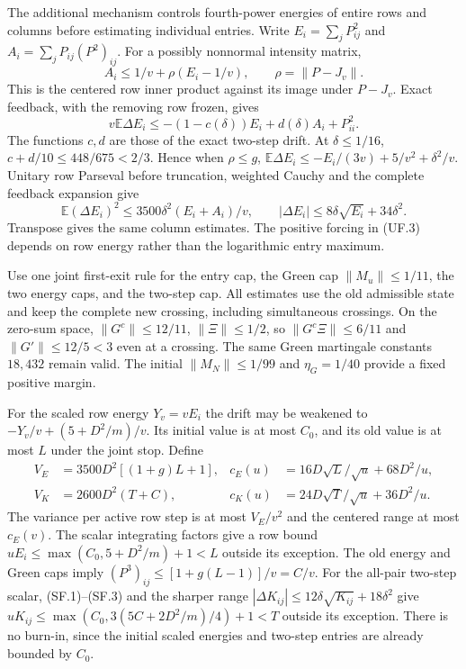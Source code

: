 The additional mechanism controls fourth-power energies of entire rows
and columns before estimating individual entries. Write
$E_i=\sum_jP_{ij}^2$ and $A_i=\sum_jP_{ij}(P^2)_{ij}$. For a possibly
nonnormal intensity matrix,
\[
 A_i\le1/v+\rho(E_i-1/v),\qquad \rho=\|P-J_v\|.           \tag{UF.3}
\]
This is the centered row inner product against its image under $P-J_v$.
Exact feedback, with the removing row frozen, gives
\[
 v\mathbb E\Delta E_i\le-(1-c(\delta))E_i+d(\delta)A_i+P_{ii}^2.
                                                                  \tag{UF.4}
\]
The functions $c,d$ are those of the exact two-step drift. At
$\delta\le1/16$, $c+d/10\le448/675<2/3$. Hence when $\rho\le g$,
$\mathbb E\Delta E_i\le-E_i/(3v)+5/v^2+\delta^2/v$.
Unitary row Parseval before truncation, weighted Cauchy and the complete
feedback expansion give
\[
 \mathbb E(\Delta E_i)^2\le3500\delta^2(E_i+A_i)/v,
 \qquad |\Delta E_i|\le8\delta\sqrt{E_i}+34\delta^2.        \tag{UF.5}
\]
Transpose gives the same column estimates. The positive forcing in
(UF.3) depends on row energy rather than the logarithmic entry maximum.

Use one joint first-exit rule for the entry cap, the Green cap
$\|M_u\|\le1/11$, the two energy caps, and the two-step cap.
All estimates use the old admissible state and keep the complete new
crossing, including simultaneous crossings. On the zero-sum space,
$\|G^c\|\le12/11$, $\|\Xi\|\le1/2$, so
$\|G^c\Xi\|\le6/11$ and $\|G'\|\le12/5<3$ even at a crossing.
The same Green martingale constants $18,432$ remain valid. The initial
$\|M_N\|\le1/99$ and $\eta_G=1/40$ provide a fixed positive margin.

For the scaled row energy $Y_v=vE_i$ the drift may be weakened to
$-Y_v/v+(5+D^2/m)/v$. Its initial value is at most $C_0$, and its old
value is at most $L$ under the joint stop. Define
\[
 \begin{aligned}
 V_E&=3500D^2[(1+g)L+1],&
 c_E(u)&=16D\sqrt L/\sqrt u+68D^2/u,\\
 V_K&=2600D^2(T+C),&
 c_K(u)&=24D\sqrt T/\sqrt u+36D^2/u.
 \end{aligned}                                                   \tag{UF.6}
\]
The variance per active row step is at most $V_E/v^2$ and the centered
range at most $c_E(v)$. The scalar integrating factors give a row bound
$uE_i\le\max(C_0,5+D^2/m)+1<L$ outside its exception.
The old energy and Green caps imply
$(P^3)_{ij}\le[1+g(L-1)]/v=C/v$. For the all-pair two-step scalar,
(SF.1)--(SF.3) and the sharper range
$|\Delta K_{ij}|\le12\delta\sqrt{K_{ij}}+18\delta^2$
give $uK_{ij}\le\max(C_0,3(5C+2D^2/m)/4)+1<T$ outside its exception.
There is no burn-in, since the initial scaled energies and two-step
entries are already bounded by $C_0$.

